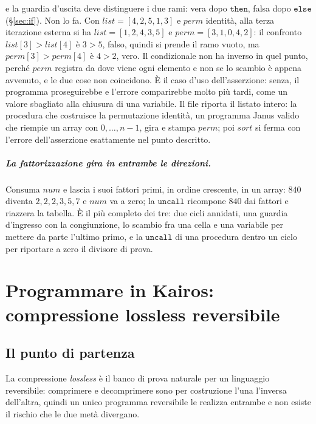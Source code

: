 \noindent
e la guardia d'uscita deve distinguere i due rami: vera dopo $\mathtt{then}$,
falsa dopo $\mathtt{else}$ (\S\ref{sec:if}). Non lo fa. Con
$\mathit{list} = [4,2,5,1,3]$ e $\mathit{perm}$ identità, alla terza iterazione
esterna si ha $\mathit{list} = [1,2,4,3,5]$ e $\mathit{perm} = [3,1,0,4,2]$: il
confronto $\mathit{list}[3] > \mathit{list}[4]$ è $3 > 5$, falso, quindi si
prende il ramo vuoto, ma $\mathit{perm}[3] > \mathit{perm}[4]$ è $4 > 2$, vero.
Il condizionale non ha inverso in quel punto, perché $\mathit{perm}$ registra da
dove viene ogni elemento e non se lo scambio è appena avvenuto, e le due cose
non coincidono. È il caso d'uso dell'asserzione: senza, il programma
proseguirebbe e l'errore comparirebbe molto più tardi, come un valore sbagliato
alla chiusura di una variabile. Il file riporta il listato intero: la
procedura che costruisce la permutazione identità, un programma Janus valido
che riempie un array con $0,\dots,n-1$, gira e stampa $\mathit{perm}$; poi
$\mathit{sort}$ si ferma con l'errore dell'asserzione esattamente nel punto
descritto.

\paragraph{La fattorizzazione gira in entrambe le direzioni.} Consuma
$\mathit{num}$ e lascia i suoi fattori primi, in ordine crescente, in un array:
$840$ diventa $2, 2, 2, 3, 5, 7$ e $\mathit{num}$ va a zero; la
$\mathtt{uncall}$ ricompone $840$ dai fattori e riazzera la tabella. È il più
completo dei tre: due cicli annidati, una guardia d'ingresso con la congiunzione,
lo scambio fra una cella e una variabile per mettere da parte l'ultimo primo, e
la $\mathtt{uncall}$ di una procedura dentro un ciclo per riportare a zero il
divisore di prova.

\chapter{Programmare in Kairos: compressione lossless reversibile}
\label{chap:programmare}
\label{sec:prog}

\section{Il punto di partenza}

La compressione \emph{lossless} è il banco di prova naturale per un linguaggio
reversibile: comprimere e decomprimere sono per costruzione l'una l'inversa
dell'altra, quindi un unico programma reversibile le realizza entrambe e non
esiste il rischio che le due metà divergano.

